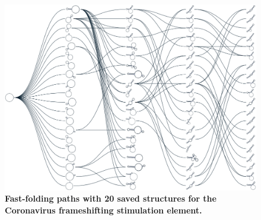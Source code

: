 \documentclass[a4paper,12pt]{article}
\begin{document}
\begin{figure}[htbp]
\centering
\includegraphics[width=.9\linewidth]{img/path_20.png}
\caption{\textbf{Fast-folding paths with 20 saved structures for the Coronavirus frameshifting stimulation element.}}
\end{figure}
\end{document}
